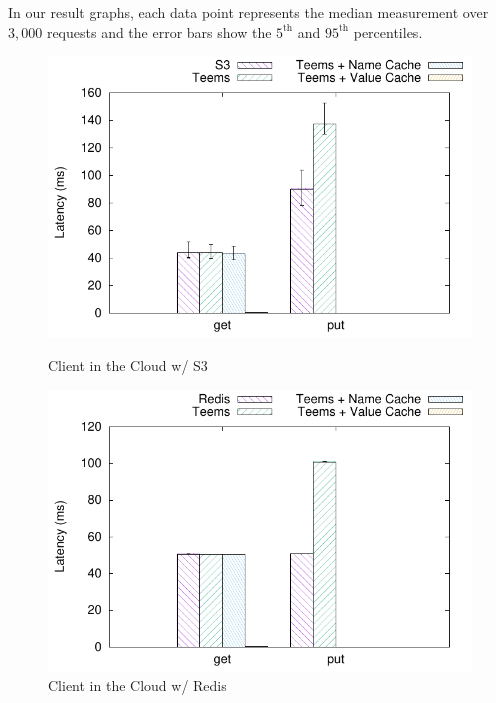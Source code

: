 In our result graphs, each data point represents the median
measurement over $3,000$ requests and the error bars show the $5^{\text{th}}$ and
$95^{\text{th}}$ percentiles.

\begin{figure}[t]
    \centering
    \begin{minipage}[t]{0.45\linewidth}
        \centering
        \includegraphics[width=\linewidth]{teem_results/deployment/result/client_cloud_s3}
        \caption{Client in the Cloud w/ S3}\label{fig:cloud_client_s3}
    \end{minipage}
    \begin{minipage}[t]{0.45\linewidth}
        \centering
        \includegraphics[width=\linewidth]{teem_results/deployment/result/client_cloud_redis}
        \caption{Client in the Cloud w/ Redis}\label{fig:cloud_client_remote_redis}
    \end{minipage}

\end{figure}
